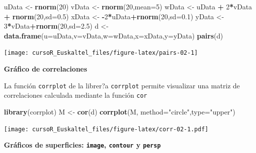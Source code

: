 \documentclass[]{book}
\newenvironment{Shaded}{\begin{snugshade}}{\end{snugshade}}
\newcommand{\KeywordTok}[1]{\textcolor[rgb]{0.13,0.29,0.53}{\textbf{#1}}}
\newcommand{\DataTypeTok}[1]{\textcolor[rgb]{0.13,0.29,0.53}{#1}}
\newcommand{\DecValTok}[1]{\textcolor[rgb]{0.00,0.00,0.81}{#1}}
\newcommand{\FloatTok}[1]{\textcolor[rgb]{0.00,0.00,0.81}{#1}}
\newcommand{\StringTok}[1]{\textcolor[rgb]{0.31,0.60,0.02}{#1}}
\newcommand{\OperatorTok}[1]{\textcolor[rgb]{0.81,0.36,0.00}{\textbf{#1}}}
\newcommand{\NormalTok}[1]{#1}
\begin{document}
\begin{Shaded}
\begin{Highlighting}[]
\NormalTok{uData <-}\StringTok{ }\KeywordTok{rnorm}\NormalTok{(}\DecValTok{20}\NormalTok{)}
\NormalTok{vData <-}\StringTok{ }\KeywordTok{rnorm}\NormalTok{(}\DecValTok{20}\NormalTok{,}\DataTypeTok{mean=}\DecValTok{5}\NormalTok{)}
\NormalTok{wData <-}\StringTok{ }\NormalTok{uData }\OperatorTok{+}\StringTok{ }\DecValTok{2}\OperatorTok{*}\NormalTok{vData }\OperatorTok{+}\StringTok{ }\KeywordTok{rnorm}\NormalTok{(}\DecValTok{20}\NormalTok{,}\DataTypeTok{sd=}\FloatTok{0.5}\NormalTok{)}
\NormalTok{xData <-}\StringTok{ }\OperatorTok{-}\DecValTok{2}\OperatorTok{*}\NormalTok{uData}\OperatorTok{+}\KeywordTok{rnorm}\NormalTok{(}\DecValTok{20}\NormalTok{,}\DataTypeTok{sd=}\FloatTok{0.1}\NormalTok{)}
\NormalTok{yData <-}\StringTok{  }\DecValTok{3}\OperatorTok{*}\NormalTok{vData}\OperatorTok{+}\KeywordTok{rnorm}\NormalTok{(}\DecValTok{20}\NormalTok{,}\DataTypeTok{sd=}\FloatTok{2.5}\NormalTok{)}
\NormalTok{d <-}\StringTok{ }\KeywordTok{data.frame}\NormalTok{(}\DataTypeTok{u=}\NormalTok{uData,}\DataTypeTok{v=}\NormalTok{vData,}\DataTypeTok{w=}\NormalTok{wData,}\DataTypeTok{x=}\NormalTok{xData,}\DataTypeTok{y=}\NormalTok{yData)}
\KeywordTok{pairs}\NormalTok{(d)}
\end{Highlighting}
\end{Shaded}

\begin{center}\texttt{[image: cursoR\_Euskaltel\_files/figure-latex/pairs-02-1]} \end{center}

\textbf{Gráfico de correlaciones}

La función \texttt{corrplot} de la librer?a \texttt{corrplot} permite
visualizar una matriz de correlaciones calculada mediante la función
\texttt{cor}

\begin{Shaded}
\begin{Highlighting}[]
\KeywordTok{library}\NormalTok{(corrplot)}
\NormalTok{M <-}\StringTok{ }\KeywordTok{cor}\NormalTok{(d)}
\KeywordTok{corrplot}\NormalTok{(M, }\DataTypeTok{method=}\StringTok{"circle"}\NormalTok{,}\DataTypeTok{type=}\StringTok{"upper"}\NormalTok{)}
\end{Highlighting}
\end{Shaded}

\texttt{[image: cursoR\_Euskaltel\_files/figure-latex/corr-02-1.pdf]}

\textbf{Gráficos de superficies: \texttt{image}, \texttt{contour} y
\texttt{persp}}
\end{document}
